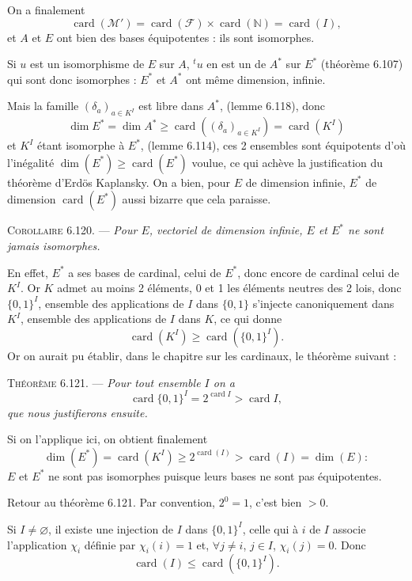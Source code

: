 On a finalement
\[
\operatorname{card}(\mathcal M')=\operatorname{card}(\mathcal F)\times\operatorname{card}(\mathbb N)=\operatorname{card}(I),
\]
et $A$ et $E$ ont bien des bases équipotentes : ils sont isomorphes. \bookend

Si $u$ est un isomorphisme de $E$ sur $A$, ${}^tu$ en est un de $A^*$ sur $E^*$ (théorème 6.107) qui sont donc isomorphes : $E^*$ et $A^*$ ont même dimension, infinie.

Mais la famille $(\delta_a)_{a\in K^I}$ est libre dans $A^*$, (lemme 6.118), donc
\[
\dim E^*=\dim A^*\ge\operatorname{card}((\delta_a)_{a\in K^I})=\operatorname{card}(K^I)
\]
et $K^I$ étant isomorphe à $E^*$, (lemme 6.114), ces 2 ensembles sont équipotents d'où l'inégalité $\dim(E^*)\ge\operatorname{card}(E^*)$ voulue, ce qui achève la justification du théorème d'Erdös Kaplansky. On a bien, pour $E$ de dimension infinie, $E^*$ de dimension $\operatorname{card}(E^*)$ aussi bizarre que cela paraisse. \bookend

\medskip\noindent\textsc{Corollaire 6.120.} --- \emph{Pour $E$, vectoriel de dimension infinie, $E$ et $E^*$ ne sont jamais isomorphes.}

En effet, $E^*$ a ses bases de cardinal, celui de $E^*$, donc encore de cardinal celui de $K^I$. Or $K$ admet au moins 2 éléments, 0 et 1 les éléments neutres des 2 lois, donc $\{0,1\}^I$, ensemble des applications de $I$ dans $\{0,1\}$ s'injecte canoniquement dans $K^I$, ensemble des applications de $I$ dans $K$, ce qui donne
\[
\operatorname{card}(K^I)\ge\operatorname{card}(\{0,1\}^I).
\]
Or on aurait pu établir, dans le chapitre sur les cardinaux, le théorème suivant :

\medskip\noindent\textsc{Théorème 6.121.} --- \emph{Pour tout ensemble $I$ on a
\[
\operatorname{card}\{0,1\}^I=2^{\operatorname{card}I}>\operatorname{card}I,
\]
que nous justifierons ensuite.}

Si on l'applique ici, on obtient finalement
\[
\dim(E^*)=\operatorname{card}(K^I)\ge2^{\operatorname{card}(I)}>\operatorname{card}(I)=\dim(E):
\]
$E$ et $E^*$ ne sont pas isomorphes puisque leurs bases ne sont pas équipotentes. \bookend

Retour au théorème 6.121. Par convention, $2^0=1$, c'est bien $>0$.

Si $I\ne\varnothing$, il existe une injection de $I$ dans $\{0,1\}^I$, celle qui à $i$ de $I$ associe l'application $\chi_i$ définie par $\chi_i(i)=1$ et, $\forall j\ne i$, $j\in I$, $\chi_i(j)=0$. Donc
\[
\operatorname{card}(I)\le\operatorname{card}(\{0,1\}^I).
\]

